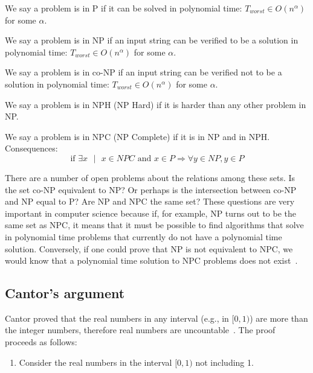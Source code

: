 \documentclass[justified, sixbynine]{tufte-book}
\theoremstyle{plain}%
\newtheorem * {corollary}{Corollary}
\theoremstyle{definition}
\theoremstyle{remark}
\newtheorem * {remark}{Remark}
\newtheorem * {note}{Note}
\begin{document}
\begin{fullwidth}
We say a problem is in P if it can be solved in polynomial time: $%
T_{worst}\in O(n^\alpha )$ for some $\alpha $.

We say a problem is in NP if an input string can be verified to be a
solution in polynomial time: $T_{worst}\in O(n^\alpha )$ for some $\alpha $.

We say a problem is in co-NP if an input string can be verified not to be a
solution in polynomial time: $T_{worst}\in O(n^\alpha )$ for some $\alpha $.

We say a problem is in NPH (NP Hard) if it is harder than any other problem
in NP.

We say a problem is in NPC (NP Complete) if it is in NP and in NPH.
Consequences:
\begin{equation}
\text{if }\exists x\text{ }|\text{ }x\in NPC\text{ and }x\in P\Rightarrow
\forall y\in NP, y\in P
\end{equation}

There are a number of open problems about the relations among these sets.
Is the set co-NP equivalent to NP? Or perhaps is the intersection between co-NP and NP equal to P?
Are NP and NPC the same set? These questions are very important in computer science because if, for example, NP turns out to be the same set as NPC, it means that it must be possible to find algorithms that solve in polynomial time problems that currently do not have a polynomial time solution. Conversely, if one could prove that NP is not equivalent to NPC, we would know that a polynomial time solution to NPC problems does not exist~\cite{pnp}.

\subsection{Cantor's argument}


Cantor proved that the real numbers in any interval (e.g., in $[0, 1)$)
are more than the integer numbers, therefore real numbers are uncountable~\cite{hofstadter}.
The proof proceeds as follows:

\begin{enumerate}
\item  Consider the real numbers in the interval $[0, 1)$ not including 1$.$


\end{enumerate}
\end{fullwidth}
\end{document}
